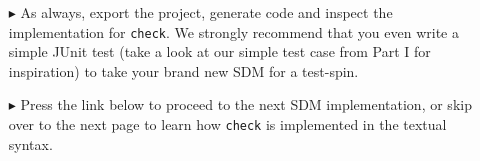 \begin{itemize}
\item[$\blacktriangleright$] As always, export the project, generate code and inspect the implementation for \texttt{check}.  We strongly recommend that you
even write a simple JUnit test (take a look at our simple test case from Part I for inspiration) to take your brand new SDM for a test-spin.

\item[$\blacktriangleright$] Press the link below to proceed to the next SDM implementation, or skip over to the next page to learn how \texttt{check} is
implemented in the textual syntax.

\end{itemize}
